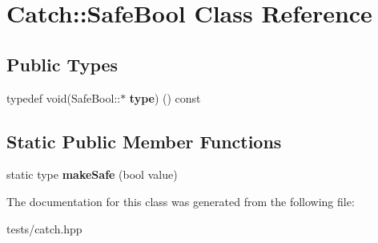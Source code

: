 \hypertarget{class_catch_1_1_safe_bool}{}\section{Catch\+:\+:Safe\+Bool Class Reference}
\label{class_catch_1_1_safe_bool}
\subsection*{Public Types}
\begin{DoxyCompactItemize}
\item 
\mbox{\label{class_catch_1_1_safe_bool_a39eef9baed296299d625a54d54a2a958}} 
typedef void(Safe\+Bool\+::$\ast$ {\bfseries type}) () const
\end{DoxyCompactItemize}
\subsection*{Static Public Member Functions}
\begin{DoxyCompactItemize}
\item 
\mbox{\label{class_catch_1_1_safe_bool_af0ea63d9820f8bf7a8b76377913c4e77}} 
static type {\bfseries make\+Safe} (bool value)
\end{DoxyCompactItemize}


The documentation for this class was generated from the following file\+:\begin{DoxyCompactItemize}
\item 
tests/catch.\+hpp\end{DoxyCompactItemize}
